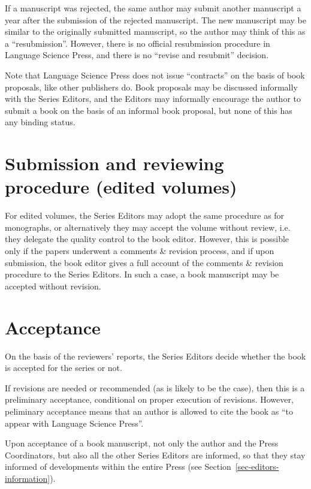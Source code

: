 If a manuscript was rejected, the same author may submit another manuscript a year after the
submission of the rejected manuscript. The new manuscript may be similar to the originally submitted
manuscript, so the author may think of this as a ``resubmission''. However, there is no official
resubmission procedure in Language Science Press, and there is no ``revise and resubmit'' decision.

Note that Language Science Press does not issue ``contracts'' on the basis of book proposals, like
other publishers do. Book proposals may be discussed informally with the Series Editors, and the
Editors may informally encourage the author to submit a book on the basis of an informal book
proposal, but none of this has any binding status.

\section{Submission and reviewing procedure (edited volumes)}

For edited volumes, the Series Editors may adopt the same procedure as for monographs, or
alternatively they may accept the volume without review, i.e. they delegate the quality control to
the book editor. However, this is possible only if the papers underwent a comments \& revision
process, and if upon submission, the book editor gives a full account of the comments \& revision
procedure to the Series Editors. In such a case, a book manuscript may be accepted without revision.

\section{Acceptance}

On the basis of the reviewers' reports, the Series Editors decide whether the book is accepted for
the series or not.

If revisions are needed or recommended (as is likely to be the case), then this is a preliminary
acceptance, conditional on proper execution of revisions. However, peliminary acceptance means that
an author is allowed to cite the book as ``to appear with Language Science Press''.

Upon acceptance of a book manuscript, not only the author and the Press Coordinators, but also all
the other Series Editors are informed, so that they stay informed of developments within the entire
Press (see Section~\ref{sec-editors-information}).


